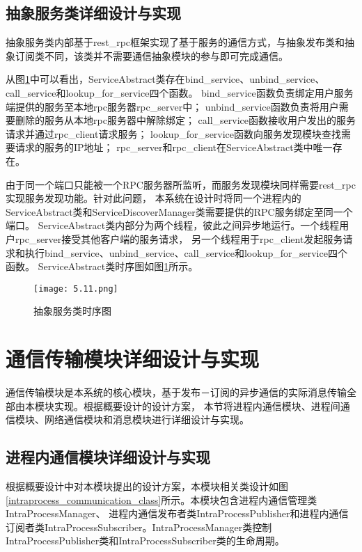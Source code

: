 \subsection{抽象服务类详细设计与实现}
抽象服务类内部基于rest\_rpc框架实现了基于服务的通信方式，与抽象发布类和抽象订阅类不同，该类并不需要通信抽象模块的参与即可完成通信。

从图\ref{service_abstract_timesequence}中可以看出，ServiceAbstract类存在bind\_service、unbind\_service、call\_service和lookup\_for\_service四个函数。
bind\_service函数负责绑定用户服务端提供的服务至本地rpc服务器rpc\_server中；
unbind\_service函数负责将用户需要删除的服务从本地rpc服务器中解除绑定；
call\_service函数接收用户发出的服务请求并通过rpc\_client请求服务；
lookup\_for\_service函数向服务发现模块查找需要请求的服务的IP地址；
rpc\_server和rpc\_client在ServiceAbstract类中唯一存在。

由于同一个端口只能被一个RPC服务器所监听，而服务发现模块同样需要rest\_rpc实现服务发现功能。针对此问题，
本系统在设计时将同一个进程内的ServiceAbstract类和ServiceDiscoverManager类需要提供的RPC服务绑定至同一个端口。
ServiceAbstract类内部分为两个线程，彼此之间异步地运行。一个线程用户rpc\_server接受其他客户端的服务请求，
另一个线程用于rpc\_client发起服务请求和执行bind\_service、unbind\_service、call\_service和lookup\_for\_service四个函数。
ServiceAbstract类时序图如图\ref{service_abstract_timesequence}所示。
\begin{figure}[H]
  \centering
  \texttt{[image: 5.11.png]}
  \caption{抽象服务类时序图}
  \label{service_abstract_timesequence}
\end{figure}

\section{通信传输模块详细设计与实现}
通信传输模块是本系统的核心模块，基于发布－订阅的异步通信的实际消息传输全部由本模块实现。根据概要设计的设计方案，
本节将进程内通信模块、进程间通信模块、网络通信模块和消息模块进行详细设计与实现。
\subsection{进程内通信模块详细设计与实现}
根据概要设计中对本模块提出的设计方案，本模块相关类设计如图\ref{intraprocess_communication_class}所示。本模块包含进程内通信管理类IntraProcessManager、
进程内通信发布者类IntraProcessPublisher和进程内通信订阅者类IntraProcessSubscriber。IntraProcessManager类控制
IntraProcessPublisher类和IntraProcessSubscriber类的生命周期。

